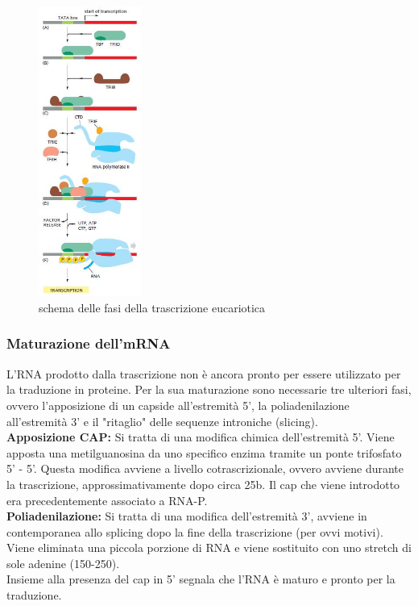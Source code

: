         \begin{figure}[h]
            \centering
            \includegraphics[width=0.3\textwidth]{images/trascrizioneEuka.JPG}
            \caption{\small schema delle fasi della trascrizione eucariotica}
            \label{fig:mesh1}
        \end{figure}
        
        \subsubsection{Maturazione dell'mRNA}
        L'RNA prodotto dalla trascrizione non è ancora pronto per essere utilizzato per la traduzione in proteine. Per la sua maturazione sono necessarie tre ulteriori fasi, ovvero l'apposizione di un capside all'estremità 5', la poliadenilazione all'estremità 3' e il "ritaglio" delle sequenze introniche (slicing). \\
            
            \textbf{Apposizione CAP:}
            Si tratta di una modifica chimica dell'estremità 5'. Viene apposta una metilguanosina da uno specifico enzima tramite un ponte trifosfato 5' - 5'. 
            Questa modifica avviene a livello cotrascrizionale, ovvero avviene durante la trascrizione, approssimativamente dopo circa 25b. Il cap che viene introdotto era precedentemente associato a RNA-P.\\
            
            \textbf{Poliadenilazione:}
            Si tratta di una modifica dell'estremità 3', avviene in contemporanea allo splicing dopo la fine della trascrizione (per ovvi motivi). Viene eliminata una piccola porzione di RNA e viene sostituito con uno stretch di sole adenine (150-250).\\
            Insieme alla presenza del cap in 5' segnala che l'RNA è maturo e pronto per la traduzione.
            
